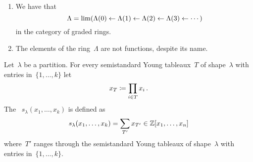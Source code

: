 \documentclass[a4paper,10pt]{scrartcl}
\begin{document}
\begin{remark}
  \leavevmode
  \begin{enumerate}
    \item
      We have that
      \[
        \Lambda
        =
        \lim( \Lambda(0) \leftarrow \Lambda(1) \leftarrow \Lambda(2) \leftarrow \Lambda(3) \leftarrow \dotsb)
      \]
      in the category of graded rings.
    \item
      The elements of the ring~$\Lambda$ are not functions, despite its name.
  \end{enumerate}
\end{remark}


\begin{example}
  Let~$\lambda$ be a partition.
  For every semistandard Young tableaux~$T$ of shape~$\lambda$ with entries in~$\{1, \dotsc, k\}$ let
  \[
    x_T
    \coloneqq
    \prod_{i \in T} x_i \,.
  \]
  The ~$s_\lambda(x_1, \dotsc, x_k)$ is defined as
  \[
    s_\lambda(x_1, \dotsc, x_k)
    =
    \sum_{T'} x_{T'}
    \in
    \mathbb{Z}[x_1, \dotsc, x_n]
  \]
  where~$T'$ ranges through the semistandard Young tableaux of shape~$\lambda$ with entries in~$\{1, \dotsc, k\}$.
  

\end{example}
\end{document}
